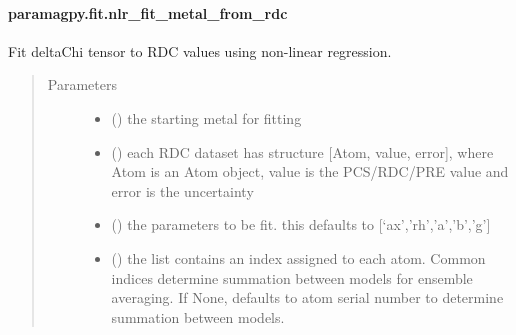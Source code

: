\documentclass[a4paper,10pt,english,openany,oneside]{sphinxmanual}
\begin{document}
\paragraph{paramagpy.fit.nlr\_fit\_metal\_from\_rdc}
\label{\detokenize{reference/generated/paramagpy.fit.nlr_fit_metal_from_rdc:paramagpy-fit-nlr-fit-metal-from-rdc}}\label{\detokenize{reference/generated/paramagpy.fit.nlr_fit_metal_from_rdc::doc}}

\begin{fulllineitems}
\label{\detokenize{reference/generated/paramagpy.fit.nlr_fit_metal_from_rdc:paramagpy.fit.nlr_fit_metal_from_rdc}}
Fit deltaChi tensor to RDC values using non-linear regression.
\begin{quote}\begin{description}
\item[{Parameters}] \leavevmode\begin{itemize}
\item {} 
 () \textendash{} the starting metal for fitting

\item {} 
 () \textendash{} each RDC dataset has structure {[}Atom, value, error{]}, where Atom is
an Atom object, value is the PCS/RDC/PRE value
and error is the uncertainty

\item {} 
 (\sphinxstyleliteralemphasis{\sphinxupquote{, }}) \textendash{} the parameters to be fit.
this defaults to {[}‘ax’,’rh’,’a’,’b’,’g’{]}

\item {} 
 (\sphinxstyleliteralemphasis{\sphinxupquote{, }}) \textendash{} the list contains an index assigned to each atom.
Common indices determine summation between models
for ensemble averaging.
If None, defaults to atom serial number to determine summation
between models.


\end{itemize}
\end{description}
\end{quote}
\end{fulllineitems}
\end{document}
